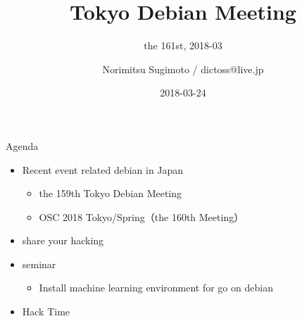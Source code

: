 \title{Tokyo Debian Meeting}
\subtitle{the 161st, 2018-03}
\author{Norimitsu Sugimoto / dictoss@live.jp}
\date{2018-03-24}



\begin{frame}
\titlepage{}
\end{frame}

\begin{frame}{Agenda}
 \begin{minipage}[t]{0.45\hsize}
  \begin{itemize}
  \item Recent event related debian in Japan
    \begin{itemize}
    \item the 159th Tokyo Debian Meeting
    \item OSC 2018 Tokyo/Spring（the 160th Meeting）
    \end{itemize}
  \item share your hacking
  \end{itemize}
 \end{minipage}
 \begin{minipage}[t]{0.45\hsize}
  \begin{itemize}
  \item seminar
    \begin{itemize}
    \item Install machine learning environment for go on debian
    \end{itemize}
  \item Hack Time
  \end{itemize}
 \end{minipage}
\end{frame}

